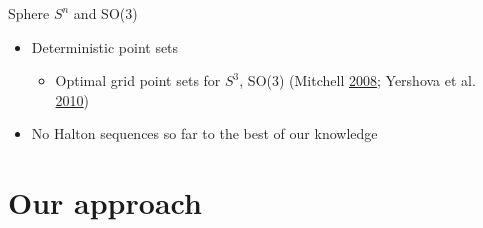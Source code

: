 \begin{frame}{Sphere \(S^n\) and SO(3)}
\protect\hypertarget{sub:sphere_s_n_and_so_3_}{}

\begin{itemize}
\item
  Deterministic point sets

  \begin{itemize}
  \tightlist
  \item
    Optimal grid point sets for \(S^3\), SO(3) (Mitchell
    \protect\hyperlink{ref-mitchell2008sampling}{2008}; Yershova et al.
    \protect\hyperlink{ref-yershova2010generating}{2010})
  \end{itemize}
\item
  No Halton sequences so far to the best of our knowledge
\end{itemize}

\end{frame}

\hypertarget{our-approach}{%
\section{Our approach}\label{our-approach}}


